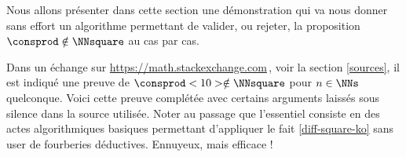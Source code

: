 Nous allons présenter dans cette section une démonstration qui va nous donner sans effort un algorithme permettant de valider, ou rejeter, la proposition $\consprod \notin \NNsquare$ au cas par cas. 

\medskip

Dans un échange sur \url{https://math.stackexchange.com}\,, voir la section \ref{sources}, il est indiqué une preuve de $\consprod<10> \notin \NNsquare$ pour $n \in \NNs$ quelconque.
Voici cette preuve complétée avec certains arguments laissés sous silence dans la source utilisée.
Noter au passage que l'essentiel consiste en des actes algorithmiques basiques permettant d'appliquer le fait \ref{diff-square-ko} sans user de fourberies déductives. Ennuyeux, mais efficace !




